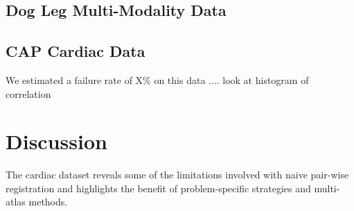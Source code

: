 \documentclass{llncs}
\begin{document}
\subsection{Dog Leg Multi-Modality Data}

\subsection{CAP Cardiac Data}
We estimated a failure rate of X\% on this data  .... look at
histogram of correlation 

\section{Discussion}

The cardiac dataset reveals some of the limitations involved with naive
pair-wise registration and highlights the benefit of
problem-specific strategies and multi-atlas methods.  



\end{document}
